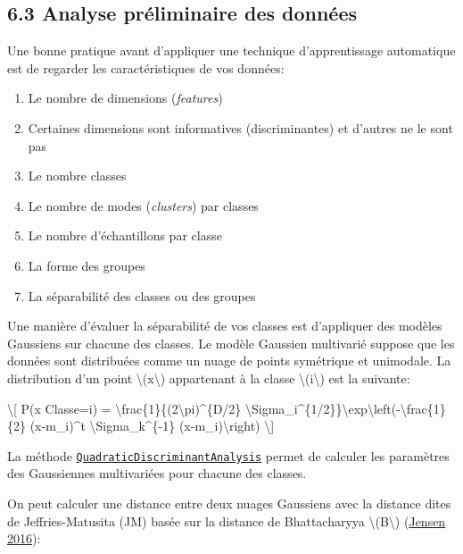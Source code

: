 \documentclass[
]{article}
\begin{document}
\subsection{\texorpdfstring{{6.3} Analyse préliminaire des
données}{6.3 Analyse préliminaire des données}}\label{analyse-pruxe9liminaire-des-donnuxe9es}

Une bonne pratique avant d'appliquer une technique d'apprentissage
automatique est de regarder les caractéristiques de vos données:

\begin{enumerate}
\def\labelenumi{\arabic{enumi}.}
\item
  Le nombre de dimensions (\emph{features})
\item
  Certaines dimensions sont informatives (discriminantes) et d'autres ne
  le sont pas
\item
  Le nombre classes
\item
  Le nombre de modes (\emph{clusters}) par classes
\item
  Le nombre d'échantillons par classe
\item
  La forme des groupes
\item
  La séparabilité des classes ou des groupes
\end{enumerate}

Une manière d'évaluer la séparabilité de vos classes est d'appliquer des
modèles Gaussiens sur chacune des classes. Le modèle Gaussien multivarié
suppose que les données sont distribuées comme un nuage de points
symétrique et unimodale. La distribution d'un point
{\textbackslash(x\textbackslash)} appartenant à la classe
{\textbackslash(i\textbackslash)} est la suivante:

{\textbackslash{[} P(x \textbar{} Classe=i) =
\textbackslash frac\{1\}\{(2\textbackslash pi)\^{}\{D/2\}
\textbar\textbackslash Sigma\_i\textbar\^{}\{1/2\}\}\textbackslash exp\textbackslash left(-\textbackslash frac\{1\}\{2\}
(x-m\_i)\^{}t \textbackslash Sigma\_k\^{}\{-1\}
(x-m\_i)\textbackslash right) \textbackslash{]}}

La méthode
\href{https://scikit-learn.org/stable/modules/generated/sklearn.discriminant_analysis.QuadraticDiscriminantAnalysis.html}{\texttt{QuadraticDiscriminantAnalysis}}
permet de calculer les paramètres des Gaussiennes multivariées pour
chacune des classes.

On peut calculer une distance entre deux nuages Gaussiens avec la
distance dites de Jeffries-Matusita (JM) basée sur la distance de
Bhattacharyya {\textbackslash(B\textbackslash)}
{(\href{references.html\#ref-Jensen2016}{Jensen 2016})}:
\end{document}
